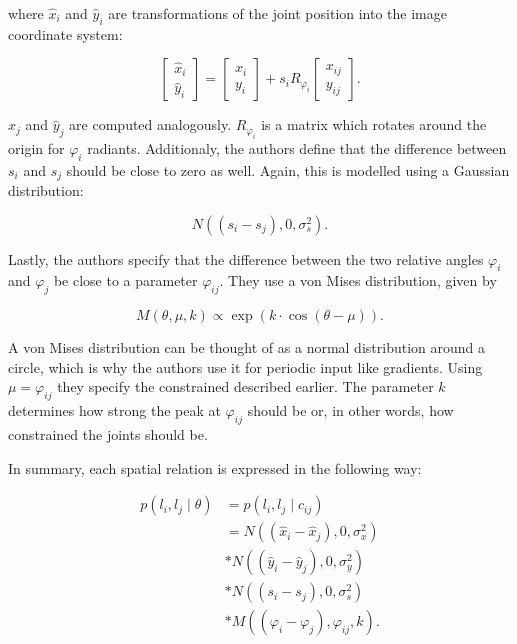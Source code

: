 where $\hat{x}_i$ and $\hat{y}_i$ are transformations of the joint position into the image coordinate system:

\begin{equation}
    \begin{bmatrix}
        \hat{x}_i \\ 
        \hat{y}_i
    \end{bmatrix}
    =
    \begin{bmatrix}
        x_i \\ 
        y_i
    \end{bmatrix}
    + s_i R_{\varphi_i}
    \begin{bmatrix}
        x_{ij} \\ 
        y_{ij}
    \end{bmatrix}.
\end{equation}

$\hat{x}_j$ and $\hat{y}_j$ are computed analogously.
$R_{\varphi_i}$ is a matrix which rotates around the origin for $\varphi_i$ radiants.
Additionaly, the authors define that the difference between $s_i$ and $s_j$ should be close to zero as well.
Again, this is modelled using a Gaussian distribution:

\begin{equation}
    N((s_i - s_j), 0, \sigma^2_s).
\end{equation}

Lastly, the authors specify that the difference between the two relative angles $\varphi_i$ and $\varphi_j$ be close to a parameter $\varphi_{ij}$.
They use a von Mises distribution, given by

\begin{equation}
    M(\theta, \mu, k) \propto \exp (k \cdot \cos (\theta - \mu)).
\end{equation}

A von Mises distribution can be thought of as a normal distribution around a circle, which is why the authors use it for periodic input like gradients.
Using $\mu = \varphi_{ij}$ they specify the constrained described earlier.
The parameter $k$ determines how strong the peak at $\varphi_{ij}$ should be or, in other words, how constrained the joints should be.

In summary, each spatial relation is expressed in the following way:

\begin{equation}
    \begin{split}
        p(l_i, l_j \mid \theta) 
        &= p(l_i, l_j \mid c_{ij}) \\
        &= N((\hat{x}_i - \hat{x}_j), 0, \sigma_x^2) \\
        &* N((\hat{y}_i - \hat{y}_j), 0, \sigma_y^2) \\
        &* N((s_i - s_j), 0, \sigma_s^2) \\
        &* M((\varphi_i - \varphi_j), \varphi_{ij}, k).
    \end{split}    
\end{equation}

